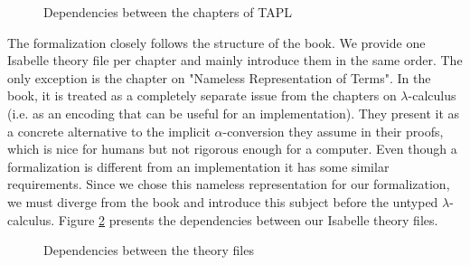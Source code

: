 \begin{figure}[h]
  \begin{center}
  \end{center}
  \caption{Dependencies between the chapters of TAPL}
  \label{fig:TAPL-dependencies}
\end{figure}

The formalization closely follows the structure of the book. We provide one Isabelle theory file per
chapter and mainly introduce them in the same order. The only exception is the chapter on "Nameless
Representation of Terms". In the book, it is treated as a completely separate issue from the
chapters on $\lambda$-calculus (i.e. as an encoding that can be useful for an implementation). They
present it as a concrete alternative to the implicit $\alpha$-conversion they assume in their
proofs, which is nice for humans but not rigorous enough for a computer. Even though a formalization
is different from an implementation it has some similar requirements. Since we chose this nameless
representation for our formalization, we must diverge from the book and introduce this subject
before the untyped $\lambda$-calculus. Figure \ref{fig:thys-dependencies} presents the dependencies
between our Isabelle theory files.

\begin{figure}[h]
  \begin{center}
  \end{center}
  \caption{Dependencies between the theory files}
  \label{fig:thys-dependencies}
\end{figure}

